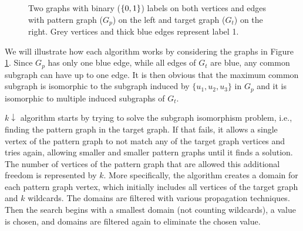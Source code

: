 \documentclass{l4proj}
\theoremstyle{definition}
\theoremstyle{remark}
\begin{document}
\begin{figure}
  \centering
  \caption{Two graphs with binary ($\protect{\{ 0, 1 \}}$) labels on both vertices
    and edges with pattern graph ($G_p$) on the left and target graph ($G_t$) on the
    right. Grey vertices and thick blue edges represent label 1.}
  \label{fig:graphs}
\end{figure}

We will illustrate how each algorithm works by considering the graphs in Figure
\ref{fig:graphs}. Since $G_p$ has only one blue edge, while all edges of $G_t$
are blue, any common subgraph can have up to one edge. It is then obvious that
the maximum common subgraph is isomorphic to the subgraph induced by $\{ u_1,
u_2, u_3 \}$ in $G_p$ and it is isomorphic to multiple induced subgraphs of
$G_t$.

$k\downarrow$ algorithm \cite{DBLP:conf/aaai/HoffmannMR17} starts by trying to
solve the subgraph isomorphism problem, i.e., finding the pattern graph in the
target graph. If that fails, it allows a single vertex of the pattern graph to
not match any of the target graph vertices and tries again, allowing smaller and
smaller pattern graphs until it finds a solution. The number of vertices of the
pattern graph that are allowed this additional freedom is represented by $k$.
More specifically, the algorithm creates a domain for each pattern graph vertex,
which initially includes all vertices of the target graph and $k$ wildcards. The
domains are filtered with various propagation techniques. Then the search begins
with a smallest domain (not counting wildcards), a value is chosen, and domains
are filtered again to eliminate the chosen value.
\end{document}
